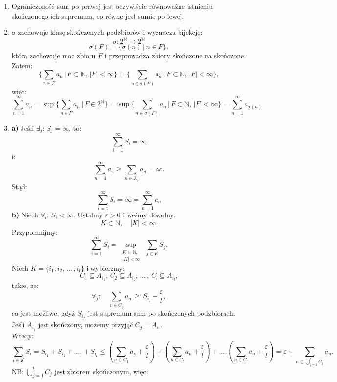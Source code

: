 \documentclass{article}
\numberwithin{defi}{section}
\numberwithin{defi}{section}
\newcommand{\N}{\mathbb{N}}
\newcommand{\oo}{\infty}
\begin{document}
\begin{dow}
    \begin{enumerate}
        \item Ograniczoność sum po prawej jest oczywiście równoważne istnieniu skończonego ich supremum, co równe jest sumie po lewej.
        \item $\sigma$ zachowuje klasę skończonych podzbiorów i wyznacza bijekcję:
              \[\sigma: 2^{\N} \rightarrow 2^{\N}\]
              \[\sigma(F) = \{ \sigma(n)\,|\, n \in F \},\]
              która zachowuje moc zbioru $F$ i przeprowadza zbiory skończone na skończone. Zatem:
              \[\biggl\{ \sum_{n \in F} a_n \, \bigg| \, F \subset \N, \, |F| < \oo\biggr\} = \biggl\{ \sum_{n \in \sigma(F)} a_{n} \, \bigg| \, F \subset \N, \, |F| < \oo\biggr\}, \]
              więc:
              \[ \sum_{n=1}^{\oo} a_n = \sup{\biggl\{ \sum_{n \in F} a_n \, \bigg| \, F \in 2^{\N}\biggr\}}  = \sup{\biggl\{ \sum_{n \in \sigma(F)} a_{n} \, \bigg| \, F \subset \N, \, |F| < \oo\biggr\}} = \sum_{n=1}^{\oo} a_{\sigma(n)}\]
        \item
              \textbf{a)} Jeśli $\exists_j: \, S_j = \oo$, to:
              \[\sum_{i=1}^{\oo} S_i = \oo\]
              i:
              \[\sum_{n=1}^{\oo} a_n \geqslant \sum_{n \in A_j} a_n = \oo.\]
              Stąd:
              \[\sum_{i=1}^{\oo} S_i = \oo = \sum_{n=1}^{\oo} a_n\]
              \textbf{b)} Niech $\forall_{i}: \, S_i < \oo$. Ustalmy $\varepsilon > 0$ i weźmy dowolny:
              \[K \subset \N, \quad |K| < \oo.\]
              Przypomnijmy:
              \[\sum_{i=1}^{\oo}S_i = \sup_{\substack{K \subset \N, \\ |K| < \oo}} \, \sum_{j \in K} S_j.\]
              Niech $K = \{ i_1, i_2,\, ...\,, i_l \}$ i wybierzmy:
              \[C_1 \subseteq A_{i_1}, \, C_2 \subseteq A_{i_2}, \, ...\, , \, C_l \subseteq A_{i_l}, \]
              takie, że:
              \[\forall_j: \quad \sum_{n \in C_j} a_n \,  \geqslant \, S_{i_j} - \frac{\varepsilon}{l},\]
              co jest możliwe, gdyż $S_{i_j}$ jest supremum sum po skończonych podzbiorach. Jeśli $A_{i_j}$ jest skończony, możemy przyjąć $C_j = A_{i_j}$. \\
              Wtedy:
              \[\sum_{i \in K} S_i = S_{i_1} + S_{i_2} + \, ... \, + S_{i_l} \leqslant \left( \sum_{n\in C_1} a_n + \frac{\varepsilon}{l} \right) + \left( \sum_{n\in C_l} a_n + \frac{\varepsilon}{l} \right) + \, ... \, \left( \sum_{n\in C_l} a_n + \frac{\varepsilon}{l} \right) = \varepsilon + \sum_{n \in \bigcup_{j=1}^l C_j} a_n.\]
              NB: $\bigcup_{j=1}^l C_j$ jest zbiorem skończonym, więc:

\end{enumerate}
\end{dow}
\end{document}

